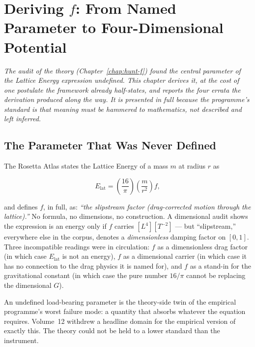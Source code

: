\documentclass[11pt, letterpaper, openany]{book}
\begin{document}
\chapter{Deriving $f$: From Named Parameter to Four-Dimensional Potential}

\begin{center}
\textit{The audit of the theory (Chapter~\ref{chap:hunt-f}) found the central parameter of the
Lattice Energy expression undefined. This chapter derives it, at the cost of one postulate the
framework already half-states, and reports the four errata the derivation produced along the way.
It is presented in full because the programme's standard is that meaning must be hammered to
mathematics, not described and left inferred.}
\end{center}

\section{The Parameter That Was Never Defined}

The Rosetta Atlas states the Lattice Energy of a mass $m$ at radius $r$ as

\begin{equation}
E_{\mathrm{lat}} = \left(\frac{16}{\pi}\right)\left(\frac{m}{r^2}\right) f ,
\label{eq:elat-f}
\end{equation}

and defines $f$, in full, as: \emph{``the slipstream factor (drag-corrected motion through the
lattice).''} No formula, no dimensions, no construction. A dimensional audit shows the expression
is an energy only if $f$ carries $[L^4][T^{-2}]$ --- but ``slipstream,'' everywhere else in the
corpus, denotes a \emph{dimensionless} damping factor on $[0,1]$. Three incompatible readings were
in circulation: $f$ as a dimensionless drag factor (in which case $E_{\mathrm{lat}}$ is not an
energy), $f$ as a dimensional carrier (in which case it has no connection to the drag physics it is
named for), and $f$ as a stand-in for the gravitational constant (in which case the pure number
$16/\pi$ cannot be replacing the dimensional $G$).

\begin{formbox}
An undefined load-bearing parameter is the theory-side twin of the empirical programme's worst
failure mode: a quantity that absorbs whatever the equation requires. Volume~12 withdrew a headline
domain for the empirical version of exactly this. The theory could not be held to a lower standard
than the instrument.
\end{formbox}
\end{document}
